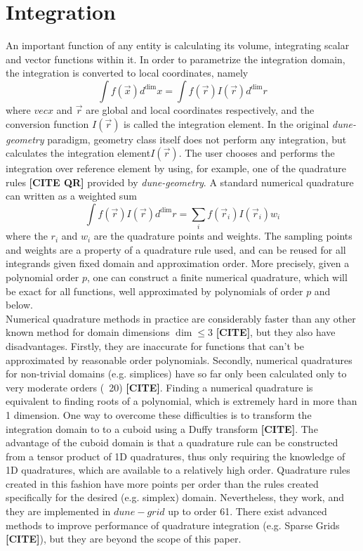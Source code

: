 \section{Integration}

An important function of any entity is calculating its volume, integrating scalar and vector functions within it. In order to parametrize the integration domain, the integration is converted to local coordinates, namely
\[ \int f(\vec{x}) d^{\dim} x = \int f(\vec{r}) I(\vec{r}) d^{\dim} r \]
where $vec{x}$ and $\vec{r}$ are global and local coordinates respectively, and the conversion function $I(\vec{r})$ is called the integration element. In the original \textit{dune-geometry} paradigm, geometry class itself does not perform any integration, but calculates the integration element$I(\vec{r})$. The user chooses and performs the integration over reference element by using, for example, one of the quadrature rules \textbf{[CITE QR]} provided by \textit{dune-geometry}. A standard numerical quadrature can written as a weighted sum
\[ \int f(\vec{r}) I(\vec{r}) d^{\dim} r = \sum_i f(\vec{r}_i) I(\vec{r}_i) w_i  \]
where the $r_i$ and $w_i$ are the quadrature points and weights. The sampling points and weights are a property of a quadrature rule used, and can be reused for all integrands given fixed domain and approximation order. More precisely, given a polynomial order $p$, one can construct a finite numerical quadrature, which will be exact for all functions, well approximated by polynomials of order $p$ and below. \\

\noindent
Numerical quadrature methods in practice are considerably faster than any other known method for domain dimensions $\dim \leq 3$ \textbf{[CITE]}, but they also have disadvantages. Firstly, they are inaccurate for functions that can't be approximated by reasonable order polynomials. Secondly, numerical quadratures for non-trivial domains (e.g. simplices) have so far only been calculated only to very moderate orders (~20) \textbf{[CITE]}. Finding a numerical quadrature is equivalent to finding roots of a polynomial, which is extremely hard in more than 1 dimension. One way to overcome these difficulties is to transform the integration domain to to a cuboid using a Duffy transform \textbf{[CITE]}. The advantage of the cuboid domain is that a quadrature rule can be constructed from a tensor product of 1D quadratures, thus only requiring the knowledge of 1D quadratures, which are available to a relatively high order. Quadrature rules created in this fashion have more points per order than the rules created specifically for the desired (e.g. simplex) domain. Nevertheless, they work, and they are implemented in $dune-grid$ up to order 61. There exist advanced methods to improve performance of quadrature integration (e.g. Sparse Grids \textbf{[CITE]}), but they are beyond the scope of this paper. \\

